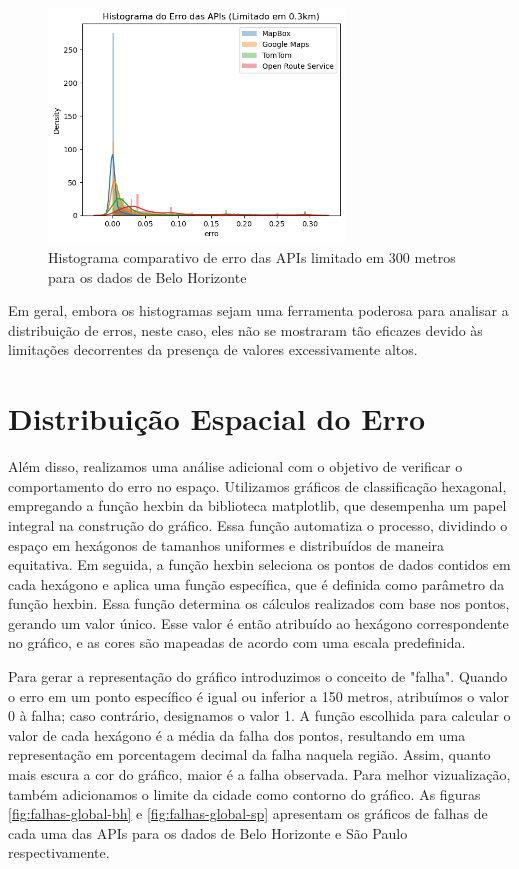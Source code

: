 \begin{figure}[h]
  \centering
  \includegraphics[width=0.7\textwidth]{Figuras/histLimitadoBH.png}
  \caption{Histograma comparativo de erro das APIs limitado em 300 metros para os dados de Belo Horizonte}
  \label{fig:histLimitadoBH}
\end{figure}

Em geral, embora os histogramas sejam uma ferramenta poderosa para analisar a distribuição de erros, neste caso, eles não se mostraram tão eficazes devido às limitações decorrentes da presença de valores excessivamente altos.

\section{Distribuição Espacial do Erro}

Além disso, realizamos uma análise adicional com o objetivo de verificar o comportamento do erro no espaço. Utilizamos gráficos de classificação hexagonal, empregando a função hexbin da biblioteca matplotlib, que desempenha um papel integral na construção do gráfico. Essa função automatiza o processo, dividindo o espaço em hexágonos de tamanhos uniformes e distribuídos de maneira equitativa. Em seguida, a função hexbin seleciona os pontos de dados contidos em cada hexágono e aplica uma função específica, que é definida como parâmetro da função hexbin. Essa função determina os cálculos realizados com base nos pontos, gerando um valor único. Esse valor é então atribuído ao hexágono correspondente no gráfico, e as cores são mapeadas de acordo com uma escala predefinida.

Para gerar a representação do gráfico introduzimos o conceito de "falha". Quando o erro em um ponto específico é igual ou inferior a 150 metros, atribuímos o valor 0 à falha; caso contrário, designamos o valor 1. A função escolhida para calcular o valor de cada hexágono é a média da falha dos pontos, resultando em uma representação em porcentagem decimal da falha naquela região. Assim, quanto mais escura a cor do gráfico, maior é a falha observada. Para melhor vizualização, também adicionamos o limite da cidade como contorno do gráfico. As figuras \ref{fig:falhas-global-bh} e \ref{fig:falhas-global-sp} apresentam os gráficos de falhas de cada uma das APIs para os dados de Belo Horizonte e São Paulo respectivamente. 

